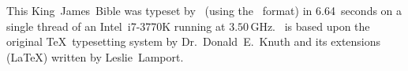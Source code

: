 \documentclass[
  twoside,
  ]{bible}
\begin{document}
\backmatter\onecolumn




\thispagestyle{empty}
\null\vfil\noindent
This King~James~Bible was typeset by \XeTeX\ (using the \XeLaTeX\ format) in
6.64~seconds on a single thread of an Intel~\mbox{i7-3770K} running at
$3.50\,\mathrm{GHz}$.  \XeLaTeX\ is based upon the original \TeX\
typesetting system by Dr.~Donald~E.~Knuth and its extensions (\LaTeX)
written by Leslie~Lamport.
\vfil\vfil
\end{document}

